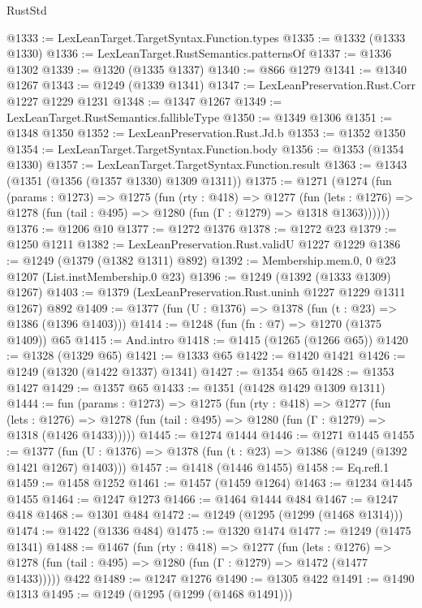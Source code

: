 \begin{lexlean}{RustStd}
\begin{coremodule}
@1333 := LexLeanTarget.TargetSyntax.Function.types
@1335 := @1332 (@1333 @1330)
@1336 := LexLeanTarget.RustSemantics.patternsOf
@1337 := @1336 @1302
@1339 := @1320 (@1335 @1337)
@1340 := @866 @1279
@1341 := @1340 @1267
@1343 := @1249 (@1339 @1341)
@1347 := LexLeanPreservation.Rust.Corr @1227 @1229 @1231
@1348 := @1347 @1267
@1349 := LexLeanTarget.RustSemantics.fallibleType
@1350 := @1349 @1306
@1351 := @1348 @1350
@1352 := LexLeanPreservation.Rust.Jd.b
@1353 := @1352 @1350
@1354 := LexLeanTarget.TargetSyntax.Function.body
@1356 := @1353 (@1354 @1330)
@1357 := LexLeanTarget.TargetSyntax.Function.result
@1363 := @1343 (@1351 (@1356 (@1357 @1330) @1309 @1311))
@1375 := @1271
    (@1274
      (fun (params : @1273) =>
      @1275
        (fun (rty : @418) =>
        @1277
          (fun (lets : @1276) =>
          @1278 (fun (tail : @495) => @1280 (fun (Γ : @1279) => @1318 @1363))))))
@1376 := @1206 @10
@1377 := @1272 @1376
@1378 := @1272 @23
@1379 := @1250 @1211
@1382 := LexLeanPreservation.Rust.validU @1227 @1229
@1386 := @1249 (@1379 (@1382 @1311) @892)
@1392 := Membership.mem.{0, 0} @23 @1207 (List.instMembership.{0} @23)
@1396 := @1249 (@1392 (@1333 @1309) @1267)
@1403 := @1379 (LexLeanPreservation.Rust.uninh @1227 @1229 @1311 @1267) @892
@1409 := @1377 (fun (U : @1376) => @1378 (fun (t : @23) => @1386 (@1396 @1403)))
@1414 := @1248 (fun (fn : @7) => @1270 (@1375 @1409)) @65
@1415 := And.intro
@1418 := @1415 (@1265 (@1266 @65))
@1420 := @1328 (@1329 @65)
@1421 := @1333 @65
@1422 := @1420 @1421
@1426 := @1249 (@1320 (@1422 @1337) @1341)
@1427 := @1354 @65
@1428 := @1353 @1427
@1429 := @1357 @65
@1433 := @1351 (@1428 @1429 @1309 @1311)
@1444 := fun (params : @1273) =>
  @1275
    (fun (rty : @418) =>
    @1277
      (fun (lets : @1276) =>
      @1278 (fun (tail : @495) => @1280 (fun (Γ : @1279) => @1318 (@1426 @1433)))))
@1445 := @1274 @1444
@1446 := @1271 @1445
@1455 := @1377 (fun (U : @1376) => @1378 (fun (t : @23) => @1386 (@1249 (@1392 @1421 @1267) @1403)))
@1457 := @1418 (@1446 @1455)
@1458 := Eq.refl.{1}
@1459 := @1458 @1252
@1461 := @1457 (@1459 @1264)
@1463 := @1234 @1445 @1455
@1464 := @1247 @1273
@1466 := @1464 @1444 @484
@1467 := @1247 @418
@1468 := @1301 @484
@1472 := @1249 (@1295 (@1299 (@1468 @1314)))
@1474 := @1422 (@1336 @484)
@1475 := @1320 @1474
@1477 := @1249 (@1475 @1341)
@1488 := @1467
    (fun (rty : @418) =>
    @1277
      (fun (lets : @1276) =>
      @1278 (fun (tail : @495) => @1280 (fun (Γ : @1279) => @1472 (@1477 @1433)))))
    @422
@1489 := @1247 @1276
@1490 := @1305 @422
@1491 := @1490 @1313
@1495 := @1249 (@1295 (@1299 (@1468 @1491)))

\end{coremodule}
\end{lexlean}
